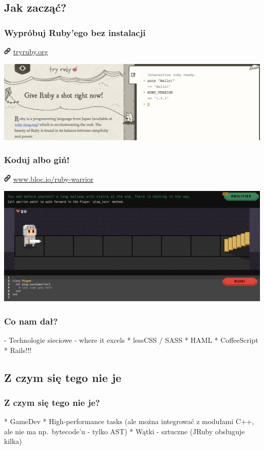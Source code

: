 \documentclass{beamer}
\newcommand{\myurl}[1]{%
    \begin{block}{}
       \centering \huge
       \includegraphics[width=0.35cm]{link.png}
       \hspace{0.1cm}
       \url{#1}
    \end{block}
}
\begin{document}
\subsection{Jak zacząć?}
\begin{frame}[fragile]
\frametitle{Wypróbuj Ruby'ego bez instalacji}
    \myurl{tryruby.org}
    \hspace*{-1.1cm}
    \includegraphics[width=\paperwidth]{tryruby.png}
\end{frame}
\begin{frame}[fragile]
\frametitle{Koduj albo giń!}
    \myurl{www.bloc.io/ruby-warrior}
    \hspace*{-1.1cm}
    \includegraphics[width=\paperwidth]{rubywarrior.png}
\end{frame}



\begin{frame}[fragile]
\frametitle{Co nam dał?}

- Technologie sieciowe - where it excels
* lessCSS / SASS
* HAML
* CoffeeScript
* Rails!!!
\end{frame}

\subsection{Z czym się tego nie je}

\begin{frame}[fragile]
\frametitle{Z czym się tego nie je?}
    * GameDev
    * High-performance tasks (ale można integrować z modułami C++, ale nie ma np.\ bytecode'u - tylko AST)
    * Wątki - sztuczne (JRuby obsługuje kilka)
\end{frame}
\end{document}

